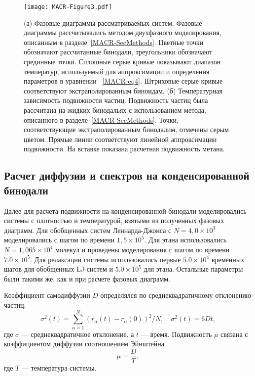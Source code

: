 \begin{figure}[!t]
\centering
 \texttt{[image: MACR-Figure3.pdf]}
 \caption{(а) Фазовые диаграммы рассматриваемых систем. Фазовые диаграммы рассчитывались методом двухфазного моделирования, описанным в разделе~\ref{MACR-SecMethods}. Цветные точки обозначают рассчитанные бинодали, треугольники обозначают срединные точки. Сплошные серые кривые показывают диапазон температур, используемый для аппроксимации и определения параметров в уравнении ~\eqref{MACR-eq4}. Штриховые серые кривые соответствуют экстраполированным биноидам. (б) Температурная зависимость подвижности частиц. Подвижность частиц была рассчитана на жидких бинодальях с использованием метода, описанного в разделе~\ref{MACR-SecMethods}. Точки, соответствующие экстраполированным бинодалим, отмечены серым цветом. Прямые линии соответствуют линейной аппроксимации подвижности. На вставке показана расчетная подвижность метана.}
\label{MACR-Figure3}
\end{figure}

\subsection{Расчет диффузии и спектров на конденсированной бинодали}

Далее для расчета подвижности на конденсированной бинодали моделировались системы с плотностью и температурой, взятыми из полученных фазовых диаграмм.
Для обобщенных систем Леннарда-Джонса с $N = 4,0 \times 10 ^ 3$ моделировались с шагом по времени $1,5 \times 10 ^ 5$. Для этана использовались $N = 1,065 \times 10 ^ 4 $ молекул и проведены моделирования с шагом по времени $7.0 \times 10^5 $. Для релаксации системы использовались первые $ 5.0 \times 10 ^ 4 $ временных шагов для обобщенных LJ-систем и $ 5.0 \times 10 ^ 5 $ для этана. Остальные параметры были такими же, как и при расчете фазовых диаграмм.

Коэффициент самодиффузии $D$ определялся по среднеквадратичному отклонению частиц:
\begin{equation}
    \sigma^2(t) = \sum\limits_{\alpha = 1}^{N} (r_{\alpha}(t) - r_{\alpha}(0))^2 / N, \quad \sigma^2(t) = 6Dt,
    \label{MACR-eq5}
\end{equation}
где $\sigma$ — среднеквадратичное отклонение, а $t$ — время. Подвижность $\mu$ связана с коэффициентом диффузии соотношением Эйнштейна
\begin{equation}
    \mu = \frac{D}{T},
    \label{MACR-eq6}
\end{equation}
где $T$ — температура системы.

